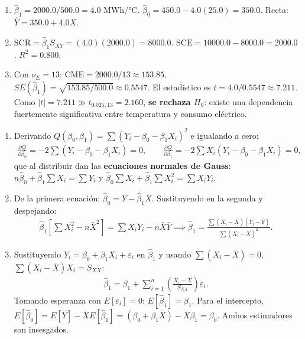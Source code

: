 \begin{solproblema}[prob:5a642fc]
	\begin{enumerate}
		\item $\hat{\beta}_1=2000.0/500.0=4.0$ MWh/°C. $\hat{\beta}_0=450.0-4.0(25.0)=350.0$. Recta: $\hat{Y}=350.0+4.0X$.
		\item $\text{SCR}=\hat{\beta}_1S_{XY}=(4.0)(2000.0)=8000.0$. $\text{SCE}=10000.0-8000.0=2000.0$. $R^2=0.800$.
		\item Con $\nu_E=13$: $\text{CME}=2000.0/13\approx153.85$, $SE(\hat{\beta}_1)=\sqrt{153.85/500.0}\approx0.5547$. El estadístico es $t=4.0/0.5547\approx7.211$. Como $|t|=7.211\gg t_{0.025,13}=2.160$, \textbf{se rechaza $H_0$}: existe una dependencia fuertemente significativa entre temperatura y consumo eléctrico.
	\end{enumerate}
\end{solproblema}

\begin{solproblema}[prob:e97453b]
	\begin{enumerate}
		\item Derivando $Q(\beta_0,\beta_1)=\sum(Y_i-\beta_0-\beta_1X_i)^2$ e igualando a cero:
		\begin{align}
			\frac{\partial Q}{\partial\beta_0} = -2\sum(Y_i-\beta_0-\beta_1X_i)=0, \qquad \frac{\partial Q}{\partial\beta_1} = -2\sum X_i(Y_i-\beta_0-\beta_1X_i)=0,
		\end{align}
		que al distribuir dan las \textbf{ecuaciones normales de Gauss}: $n\hat{\beta}_0+\hat{\beta}_1\sum X_i=\sum Y_i$ y $\hat{\beta}_0\sum X_i+\hat{\beta}_1\sum X_i^2=\sum X_iY_i$.
		\item De la primera ecuación: $\hat{\beta}_0=\bar{Y}-\hat{\beta}_1\bar{X}$. Sustituyendo en la segunda y despejando:
		\begin{align}
			\hat{\beta}_1\left[\sum X_i^2-n\bar{X}^2\right] = \sum X_iY_i-n\bar{X}\bar{Y} \implies \hat{\beta}_1 = \frac{\sum(X_i-\bar{X})(Y_i-\bar{Y})}{\sum(X_i-\bar{X})^2}.
		\end{align}
		\item Sustituyendo $Y_i=\beta_0+\beta_1X_i+\varepsilon_i$ en $\hat{\beta}_1$ y usando $\sum(X_i-\bar{X})=0$, $\sum(X_i-\bar{X})X_i=S_{XX}$:
		\begin{align}
			\hat{\beta}_1 = \beta_1 + \sum_{i=1}^n\left(\frac{X_i-\bar{X}}{S_{XX}}\right)\varepsilon_i.
		\end{align}
		Tomando esperanza con $E[\varepsilon_i]=0$: $E[\hat{\beta}_1]=\beta_1$. Para el intercepto, $E[\hat{\beta}_0]=E[\bar{Y}]-\bar{X}E[\hat{\beta}_1]=(\beta_0+\beta_1\bar{X})-\bar{X}\beta_1=\beta_0$. Ambos estimadores son insesgados.
	\end{enumerate}
\end{solproblema}

